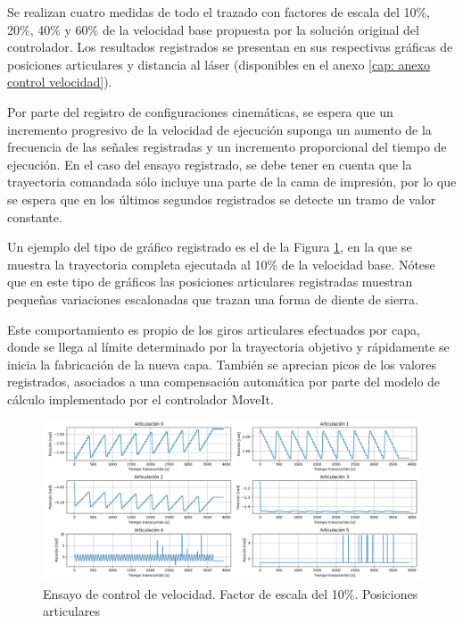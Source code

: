 Se realizan cuatro medidas de todo el trazado con factores de escala del 10\%, 20\%, 40\% y 60\% de la velocidad base propuesta por la solución original del controlador. Los resultados registrados se presentan en sus respectivas gráficas de posiciones articulares y distancia al láser (disponibles en el anexo \ref{cap: anexo control velocidad}).

Por parte del registro de configuraciones cinemáticas, se espera que un incremento progresivo de la velocidad de ejecución suponga un aumento de la frecuencia de las señales registradas y un incremento proporcional del tiempo de ejecución. En el caso del ensayo registrado, se debe tener en cuenta que la trayectoria comandada sólo incluye una parte de la cama de impresión, por lo que se espera que en los últimos segundos registrados se detecte un tramo de valor constante.

Un ejemplo del tipo de gráfico registrado es el de la Figura \ref{fig: control velocidad posiciones articulares 0.1}, en la que se muestra la trayectoria completa ejecutada al 10\% de la velocidad base. Nótese que en este tipo de gráficos las posiciones articulares registradas muestran pequeñas variaciones escalonadas que trazan una forma de diente de sierra. 

Este comportamiento es propio de los giros articulares efectuados por capa, donde se llega al límite determinado por la trayectoria objetivo y rápidamente se inicia la fabricación de la nueva capa. También se aprecian picos de los valores registrados, asociados a una compensación automática por parte del modelo de cálculo implementado por el controlador MoveIt.

\begin{figure}[h!]
    \centering
    \includegraphics[scale=0.30]{figuras/ensayo_control_velocidad/posiciones articulares 0.1.png}
    \caption{Ensayo de control de velocidad. Factor de escala del 10\%. Posiciones articulares}
    \label{fig: control velocidad posiciones articulares 0.1}
\end{figure}

